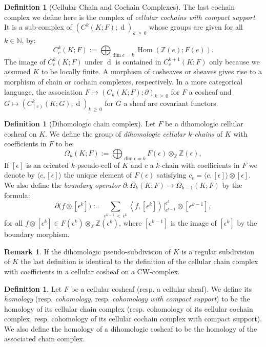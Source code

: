 \documentclass[10pt]{amsart}
\theoremstyle{definition}
\newtheorem{defi}[theo]{Definition}
\newtheorem{rema}[theo]{Remark}
\numberwithin{equation}{section}
\numberwithin{figure}{section}
\newcommand{\Z}{\mathbb{Z}}
\newcommand{\N}{\mathbb{N}}
\DeclareMathOperator{\Hom}{Hom}
\DeclareMathOperator{\df}{d}
\begin{document}
\begin{defi}[Cellular Chain and Cochain Complexes]
The last cochain complex we define here is the complex of \emph{cellular cochains with compact support}. It is a sub-complex of $(C^k(K;F);\df)_{k\,\geq \,0}$ whose groups are given for all $k\in \N$, by:
\begin{equation*}
C_c^k(K;F):=\bigoplus_{\dim e = k} \Hom(\Z(e);F(e)).
\end{equation*}
The image of $C_c^k(K;F)$ under $\df$ is contained in $C_c^{k+1}(K;F)$ only because we assumed $K$ to be locally finite. A morphism of cosheaves or sheaves gives rise to a morphism of chain or cochain complexes, respectively. In a more categorical language, the association $F\mapsto (C_k(K;F);\partial)_{k\,\geq\,0}$ for $F$ a cosheaf and $G\mapsto (C_{(c)}^k(K;G);\df)_{k\,\geq\,0}$ for $G$ a sheaf are covariant functors.
\end{defi}

\begin{defi}[Dihomologic chain complex]
Let $F$ be a dihomologic cellular cosheaf on $K$. We define the group of \emph{dihomologic cellular $k$-chains} of $K$ with coefficients in $F$ to be:
\begin{equation*}
\Omega_k(K;F):=\bigoplus_{\dim \epsilon = k} F(\epsilon)\otimes_\Z\Z(\epsilon),
\end{equation*}
If $[\epsilon]$ is an oriented $k$-pseudo-cell of $K$ and $c$ a $k$-chain with coefficients in $F$ we denote by $\langle c,[\epsilon]\rangle$ the unique element of $F(\epsilon)$ satisfying $c_\epsilon=\langle c,[\epsilon]\rangle\otimes [\epsilon]$. We also define the \emph{boundary operator} $\partial : \Omega_k(K;F) \rightarrow \Omega_{k-1}(K;F)$ by the formula:
\begin{equation*}
\partial \big(f\otimes[\epsilon^k]\big) :=\sum_{\epsilon^{k-1}\,<\,\epsilon^k} \left\langle f,[\epsilon^k]\right\rangle\big|^{\epsilon^k}_{\epsilon^{k-1}}\otimes \left[\epsilon^{k-1}\right],
\end{equation*}
for all $f\otimes[\epsilon^k] \in F(\epsilon^k)\otimes_\Z\Z(\epsilon^k)$, where $[\epsilon^{k-1}]$ is the image of $[\epsilon^k]$ by the boundary morphism.
\end{defi}

\begin{rema}
If the dihomologic pseudo-subdivision of $K$ is a regular subdivision of $K$ the last definition is identical to the definition of the cellular chain complex with coefficients in a cellular cosheaf on a CW-complex.
\end{rema}

\begin{defi}
Let $F$ be a cellular cosheaf (resp. a cellular sheaf). We define its \emph{homology} (resp. \emph{cohomology}, resp. \emph{cohomology with compact support}) to be the homology of its cellular chain complex (resp. cohomology of its cellular cochain complex, resp. cohomology of its cellular cochain complex with compact support). We also define the homology of a dihomologic cosheaf to be the homology of the associated chain complex.
\end{defi}
\end{document}
